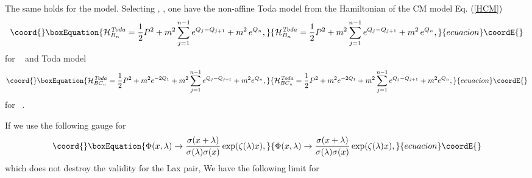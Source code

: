 \documentclass[a4paper,12pt]{article}
\begin{document}
The same holds for the \coordHE{} model. Selecting \coordHE{}, \coordHE{}, one have the
non-affine \coordHE{} Toda model from the Hamiltonian of the CM
model Eq. (\ref{HCM})
\begin{equation}\coord{}\boxEquation{
\mathcal{H}_{B_{n}}^{\mathit{Toda}}={\frac{1}{2}}P^{2}+m^{2}
\sum_{j=1}^{n-1}e^{Q_{j}-Q_{j+1}}+m^{2}\,e^{Q_{n}},
}{
\mathcal{H}_{B_{n}}^{\mathit{Toda}}={\frac{1}{2}}P^{2}+m^{2}
\sum_{j=1}^{n-1}e^{Q_{j}-Q_{j+1}}+m^{2}\,e^{Q_{n}},
}{ecuacion}\coordE{}\end{equation}
for \ \coordHE{} and \coordHE{} Toda model
\begin{equation}\coord{}\boxEquation{
\mathcal{H}_{BC_{n}}^{\mathit{Toda}}={\frac{1}{2}}
P^{2}+m^{2}e^{-2Q_{1}}+m^{2}\sum_{j=1}^{n-1}e^{Q_{j}-Q_{j+1}}+m^{2}e^{Q_{n}},
}{
\mathcal{H}_{BC_{n}}^{\mathit{Toda}}={\frac{1}{2}}
P^{2}+m^{2}e^{-2Q_{1}}+m^{2}\sum_{j=1}^{n-1}e^{Q_{j}-Q_{j+1}}+m^{2}e^{Q_{n}},
}{ecuacion}\coordE{}\end{equation}
for \ \coordHE{}.

If we use the following gauge for \coordHE{}
\cite{Kri}
\begin{equation}\coord{}\boxEquation{
\Phi (x,\lambda )\rightarrow {\frac{\sigma (x+\lambda )}{{\sigma (\lambda
)\sigma (x)}}}\exp ({\zeta (\lambda )x}),  \label{funx}
}{
\Phi (x,\lambda )\rightarrow {\frac{\sigma (x+\lambda )}{{\sigma (\lambda
)\sigma (x)}}}\exp ({\zeta (\lambda )x}),  }{ecuacion}\coordE{}\end{equation}
which does not destroy the validity\cite{kst} for the Lax
pair, We have the following limit for \coordHE{}
\end{document}
